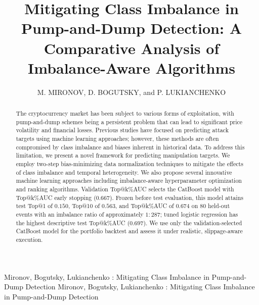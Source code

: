 \documentclass{ieeeaccess}
\begin{document}

\title{Mitigating Class Imbalance in Pump-and-Dump Detection: A Comparative Analysis of Imbalance-Aware Algorithms}
\author{\uppercase{M. Mironov},
\uppercase{D. Bogutsky}, and P. \uppercase{Lukianchenko}}

\address[1]{National Research University Higher School of Economics, Faculty of Computer Science, Laboratory of AI in Mathematical Finance (e-mail: mvmironov@hse.ru)}

\address[2]{National Research University Higher School of Economics, Faculty of Computer Science, Laboratory of AI in Mathematical Finance (e-mail: dbogucki@hse.ru)}

\address[3]{National Research University Higher School of Economics, Faculty of Computer Science, Laboratory of AI in Mathematical Finance (e-mail: plukyanchenko@hse.ru)}


\markboth
{Mironov, Bogutsky, Lukianchenko \headeretal: Mitigating Class Imbalance in Pump-and-Dump Detection}
{Mironov, Bogutsky, Lukianchenko \headeretal: Mitigating Class Imbalance in Pump-and-Dump Detection}


\begin{abstract}
The cryptocurrency market has been subject to various forms of exploitation, with pump-and-dump schemes being a persistent problem that can lead to significant price volatility and financial losses. Previous studies have focused on predicting attack targets using machine learning approaches; however, these methods are often compromised by class imbalance and biases inherent in historical data. To address this limitation, we present a novel framework for predicting manipulation targets.
We employ two-step bias-minimizing data normalization techniques to mitigate the effects of class imbalance and temporal heterogeneity. We also propose several innovative machine learning approaches including imbalance-aware hyperparameter optimization and ranking algorithms.
Validation Top@k\%AUC selects the CatBoost model with Top@k\%AUC early stopping ($0.667$). Frozen before test evaluation, this model attains test Top@1 of $0.150$, Top@10 of $0.563$, and Top@k\%AUC of $0.674$ on 80 held-out events with an imbalance ratio of approximately $1{:}287$; tuned logistic regression has the highest descriptive test Top@k\%AUC ($0.697$).
We use only the validation-selected CatBoost model for the portfolio backtest and assess it under realistic, slippage-aware execution.
\end{abstract}
\end{document}
